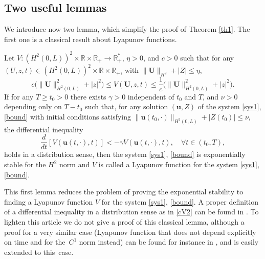 \subsection{Two useful lemmas}
We introduce now two lemma, which simplify the proof of Theorem \ref{th1}. The first one is a classical result about Lyapunov functions.
\begin{lem}
Let $V: (H^{2}(0,L))^{2}\times\mathbb{R}\times\mathbb{R}_{+}\to \mathbb{R}_{+}^{*}$, {$\eta>0$,} and $c>0$ such that for any $(U,z,t)\in (H^{2}(0,L))^{2}\times\mathbb{R}\times\mathbb{R}_{+}$, {with $\|\boldsymbol{U}\|_{H^{2}}+|Z|\leq \eta$,}
\begin{equation}
c\bigl(\lVert \boldsymbol{U} \rVert_{H^{2}(0,L)}^{{2}}+|z|^{{2}}\bigr)\leq V(\boldsymbol{U},z,t)\leq \frac{1}{c} \bigl(\lVert \boldsymbol{U} \rVert_{H^{2}(0,L)}^{{2}}+|z|^{{2}}\bigr).
\label{cV1}
\end{equation}
If {for any $T\geq t_{0}>0$} there exists $\gamma>0$ {independent of $t_{0}$ and $T$,}
and ${\nu}>0$ {depending only on $T-t_{0}$} such that, for
any solution
$(\boldsymbol{u},Z)$ of the system \eqref{sys1}, \eqref{bound} with initial conditions
satisfying $\lVert \boldsymbol{u}({t_{0}},\cdot)\rVert_{H^{2}(0,L)}+|Z({t_{0}})|\leq {\nu}$, {the differential inequality}
\begin{equation}
\frac{d}{dt}\left[V(\boldsymbol{u}(t,\cdot),t)\right]<-\gamma V(\boldsymbol{u}(t,\cdot),t),\quad\forall t\in(t_{0},T),
\label{cV2}
\end{equation}
{holds} in a distribution sense, then the system \eqref{sys1}, \eqref{bound} is exponentially stable for the $H^{2}$ norm and $V$ is called a Lyapunov function for the system \eqref{sys1}, \eqref{bound}.
\label{lem1}
\end{lem}
This first lemma reduces the problem of proving the exponential stability to finding a Lyapunov function $V$ for the system \eqref{sys1}, \eqref{bound}. A proper definition of a differential inequality in a distribution sense as in \eqref{cV2} can be found in \cite{C1}. To lighten this article we do not give a proof of this classical lemma, although a proof for a very similar case (Lyapunov function that does not depend explicitly on time and for the~$C^{1}$ norm instead) can be found for instance in \cite[Prop.\,2.1]{C1}, and is easily extended to this~case. 


